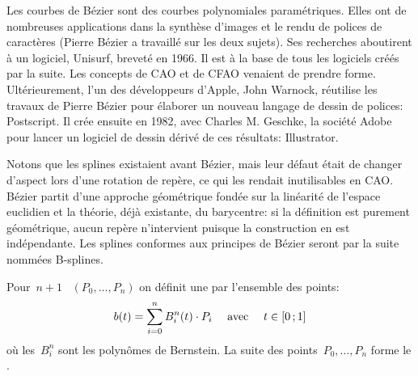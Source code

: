\begin{histoire}
Les courbes de Bézier sont des courbes polynomiales paramétriques.  Elles ont de nombreuses applications dans la synthèse d'images et le rendu de polices de caractères (Pierre Bézier a travaillé sur les deux sujets). Ses recherches aboutirent à un logiciel, Unisurf, breveté en 1966. Il est à la base de tous les logiciels créés par la suite. Les concepts de CAO et de CFAO venaient de prendre forme. Ultérieurement, l'un des développeurs d'Apple, John Warnock, réutilise les travaux de Pierre Bézier pour élaborer un nouveau langage de dessin de polices: Postscript. Il crée ensuite en 1982, avec Charles M. Geschke, la société Adobe pour lancer un logiciel de dessin dérivé de ces résultats: Illustrator. 
\end{histoire}

Notons que les splines existaient avant Bézier, mais leur défaut était de changer d'aspect lors d'une rotation de repère, ce qui les rendait inutilisables en CAO. Bézier partit d'une approche géométrique fondée sur la linéarité de l'espace euclidien et la théorie, déjà existante, du barycentre: si la définition est purement géométrique, aucun repère n'intervient puisque la construction en est indépendante. Les splines conformes aux principes de Bézier seront par la suite nommées B-splines.  

Pour~$n+1$ ~$(P_0, \dots, P_n)$ on définit une  par l'ensemble des points:
\begin{equation}
b(t)=\displaystyle\sum_{i=0}^n B_i^n(t)\cdot P_i\quad\text{ avec }\quad t \in\mathopen{[}0\,;1\mathclose{]}
\end{equation}
où les~$B_i^n$ sont les polynômes de Bernstein. La suite des points~$P_0, \ldots, P_n$ forme le . 

